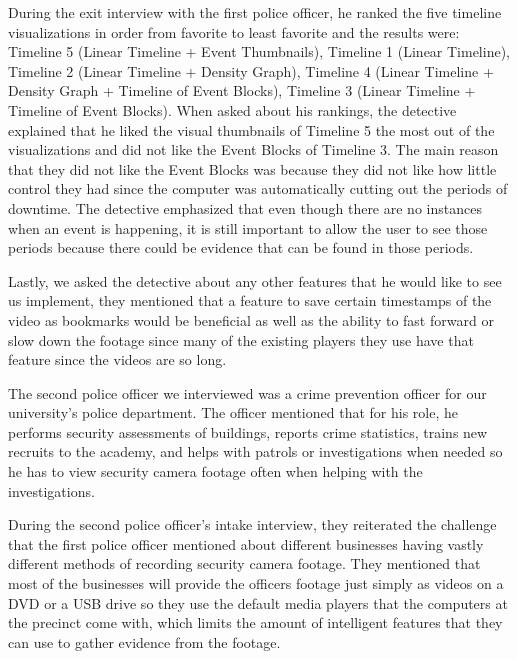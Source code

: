 \documentclass[doublespace,draft,nopageskip]{VTthesis} %
\begin{document}
During the exit interview with the first police officer, he ranked the five timeline visualizations in order from favorite to least favorite and the results were: Timeline 5 (Linear Timeline + Event Thumbnails), Timeline 1 (Linear Timeline),  Timeline 2 (Linear Timeline + Density Graph), Timeline 4 (Linear Timeline + Density Graph + Timeline of Event Blocks), Timeline 3 (Linear Timeline + Timeline of Event Blocks). When asked about his rankings, the detective explained that he liked the visual thumbnails of Timeline 5 the most out of the visualizations and did not like the Event Blocks of Timeline 3. The main reason that they did not like the Event Blocks was because they did not like how little control they had since the computer was automatically cutting out the periods of downtime. The detective emphasized that even though there are no instances when an event is happening, it is still important to allow the user to see those periods because there could be evidence that can be found in those periods.

Lastly, we asked the detective about any other features that he would like to see us implement, they mentioned that a feature to save certain timestamps of the video as bookmarks would be beneficial as well as the ability to fast forward or slow down the footage since many of the existing players they use have that feature since the videos are so long.

The second police officer we interviewed was a crime prevention officer for our university's police department. The officer mentioned that for his role, he performs security assessments of buildings, reports crime statistics, trains new recruits to the academy, and helps with patrols or investigations when needed so he has to view security camera footage often when helping with the investigations. 

During the second police officer's intake interview, they reiterated the challenge that the first police officer mentioned about different businesses having vastly different methods of recording security camera footage. They mentioned that most of the businesses will provide the officers footage just simply as videos on a DVD or a USB drive so they use the default media players that the computers at the precinct come with, which limits the amount of intelligent features that they can use to gather evidence from the footage. 
\end{document}
